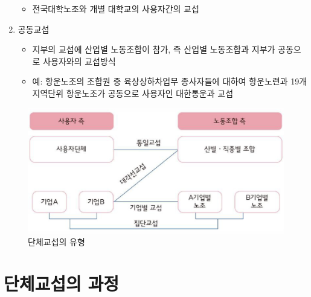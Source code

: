\documentclass[aspectratio=169,xcolor=dvipsnames,handout]{beamer}
\begin{document}
\begin{frame}[allowframebreaks]
\begin{enumerate}[<+->]
\begin{itemize}[<+->]
            \item 전국대학노조와 개별 대학교의 사용자간의 교섭
        \end{itemize}
    \item 공동교섭
        \begin{itemize}[<+->]
            \item 지부의 교섭에 산업별 노동조합이 참가, 즉 산업별 노동조합과 지부가 공동으로 사용자와의 교섭방식
            \item 예: 항운노조의 조합원 중 육상상하차업무 종사자들에 대하여 항운노련과 19개 지역단위 항운노조가 공동으로 사용자인 대한통운과 교섭
        \end{itemize}
    \end{enumerate}
    \begin{figure}
        \centering
        \includegraphics[width=.8\textwidth]{pic/단체교섭유형.png}
        \caption{단체교섭의 유형}
    \end{figure}
\end{frame}

\section{단체교섭의 과정}
\end{document}

